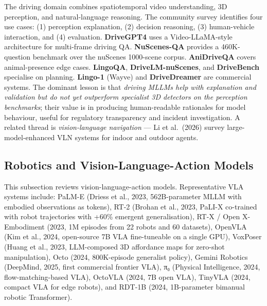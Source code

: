 \documentclass{article}
\begin{document}
The driving domain combines spatiotemporal video understanding, 3D perception, and natural-language reasoning. The community survey \citep{cui20242024} identifies four use cases: (1) perception explanation, (2) decision reasoning, (3) human-vehicle interaction, and (4) evaluation. \textbf{DriveGPT4} uses a Video-LLaMA-style architecture for multi-frame driving QA. \textbf{NuScenes-QA} \citep{qian20242024} provides a 460K-question benchmark over the nuScenes 1000-scene corpus. \textbf{AniDriveQA} \citep{wang20242024} covers animal-presence edge cases. \textbf{LingoQA}, \textbf{DriveLM-nuScenes}, and \textbf{DriveBench} specialise on planning. \textbf{Lingo-1} (Wayve) and \textbf{DriveDreamer} are commercial systems. The dominant lesson is that \emph{driving MLLMs help with explanation and validation but do not yet outperform specialist 3D detectors on the perception benchmarks}; their value is in producing human-readable rationales for model behaviour, useful for regulatory transparency and incident investigation. A related thread is \emph{vision-language navigation} --- Li et al.~(2026) survey large-model-enhanced VLN systems for indoor and outdoor agents.

\subsection{Robotics and Vision-Language-Action Models}\label{robotics-and-vision-language-action-models}

This subsection reviews vision-language-action models. Representative VLA systems include: PaLM-E (Driess et al., 2023, 562B-parameter MLLM with embodied observations as tokens), RT-2 (Brohan et al., 2023, PaLI-X co-trained with robot trajectories with +60\% emergent generalisation), RT-X / Open X-Embodiment (2023, 1M episodes from 22 robots and 60 datasets), OpenVLA (Kim et al., 2024, open-source 7B VLA fine-tuneable on a single GPU), VoxPoser (Huang et al., 2023, LLM-composed 3D affordance maps for zero-shot manipulation), Octo (2024, 800K-episode generalist policy), Gemini Robotics (DeepMind, 2025, first commercial frontier VLA), π₀ (Physical Intelligence, 2024, flow-matching-based VLA), OctoVLA (2024, 7B open VLA), TinyVLA (2024, compact VLA for edge robots), and RDT-1B (2024, 1B-parameter bimanual robotic Transformer).
\end{document}
